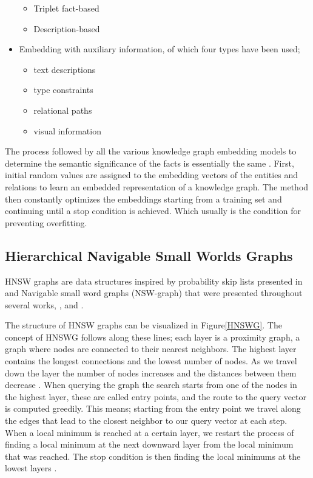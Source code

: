 \begin{itemize}
\begin{itemize}
	\item{Triplet fact-based}
	\item{Description-based}
	\end{itemize}
\item{Embedding with auxiliary information, of which four types have been used;}
	\begin{itemize}
	\item{text descriptions}
	\item{type constraints}
	\item{relational paths}
	\item{visual information}
	\end{itemize}
\end{itemize}

The process followed by all the various knowledge graph embedding models to determine the semantic significance of the facts is essentially the same \cite{KGsurvey2}. First, initial random values are assigned to the embedding vectors of the entities and relations to learn an embedded representation of a knowledge graph. The method then constantly optimizes the embeddings starting from a training set and continuing until a stop condition is achieved. Which usually is the condition for preventing overfitting.

\subsection{Hierarchical Navigable Small Worlds Graphs}
HNSW graphs are data structures inspired by probability skip lists presented in \cite{skip-lists} and Navigable small word graphs (NSW-graph) that were presented throughout several works\newline \cite{2nd-NSW}, \cite{3rd-NSW}, and \cite{1st-NSW}.

The structure of HNSW graphs can be visualized in Figure\ref{HNSWG}. The concept of HNSWG follows along these lines; each layer is a proximity graph, a graph where nodes are connected to their nearest neighbors. The highest layer contains the longest connections and the lowest number of nodes. As we travel down the layer the number of nodes increases and the distances between them decrease \cite{HNSWG}.\newline
When querying the graph the search starts from one of the nodes in the highest layer, these are called entry points, and the route to the query vector is computed greedily. This means; starting from the entry point we travel along the edges that lead to the closest neighbor to our query vector at each step. When a local minimum is reached at a certain layer, we restart the process of finding a local minimum at the next downward layer from the local minimum that was reached. The stop condition is then finding the local minimums at the lowest layers \cite{HNSWG}.\newline

